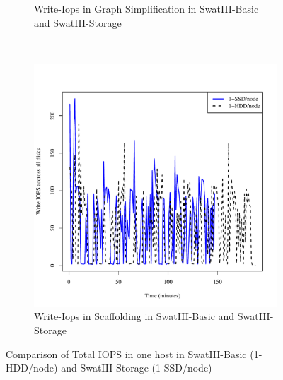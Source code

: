 \documentclass[conference]{IEEEtran}
\begin{document}
\begin{figure}[H]
\begin{subfigure}[b]{0.2\textwidth}
                \caption{Write-Iops in Graph Simplification in SwatIII-Basic and SwatIII-Storage}
                \label{fig:ECHddSsdWrIops}
        \end{subfigure}
        ~ %
        \begin{subfigure}[b]{0.2\textwidth}
                \includegraphics[width=\textwidth]{Figure/SystemData/Plots/SCFHddSsdWrIops.pdf}
                \caption{Write-Iops in Scaffolding in SwatIII-Basic and SwatIII-Storage}
                \label{fig:SCFHddSsdWrIops}
        \end{subfigure}
	\caption{Comparison of Total IOPS in one host in SwatIII-Basic (1-HDD/node) and SwatIII-Storage (1-SSD/node)} \label{fig:HddSsdRWiops}
\end{figure}
\end{document}
